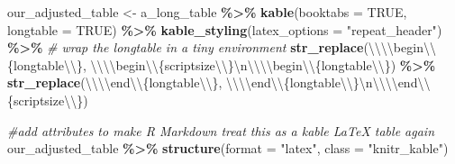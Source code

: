 \documentclass[a4paper, twoside]{templates/ociamthesis}
\newenvironment{Shaded}{\begin{snugshade}}{\end{snugshade}}
\newcommand{\CharTok}[1]{\textcolor[rgb]{0.31,0.60,0.02}{#1}}
\newcommand{\CommentTok}[1]{\textcolor[rgb]{0.56,0.35,0.01}{\textit{#1}}}
\newcommand{\DataTypeTok}[1]{\textcolor[rgb]{0.13,0.29,0.53}{#1}}
\newcommand{\KeywordTok}[1]{\textcolor[rgb]{0.13,0.29,0.53}{\textbf{#1}}}
\newcommand{\NormalTok}[1]{#1}
\newcommand{\OperatorTok}[1]{\textcolor[rgb]{0.81,0.36,0.00}{\textbf{#1}}}
\newcommand{\OtherTok}[1]{\textcolor[rgb]{0.56,0.35,0.01}{#1}}
\newcommand{\StringTok}[1]{\textcolor[rgb]{0.31,0.60,0.02}{#1}}
\renewenvironment{Shaded}
{
  \vspace{10pt}%
  \begin{snugshade}%
}{%
  \end{snugshade}%
  \vspace{8pt}%
}
\theoremstyle{definition}
\theoremstyle{definition}
\theoremstyle{definition}
\theoremstyle{definition}
\theoremstyle{remark}
\begin{document}
\begin{Shaded}
\begin{Highlighting}[]
\NormalTok{our\_adjusted\_table \textless{}{-}}\StringTok{ }\NormalTok{a\_long\_table }\OperatorTok{\%\textgreater{}\%}\StringTok{ }
\StringTok{  }\KeywordTok{kable}\NormalTok{(}\DataTypeTok{booktabs =} \OtherTok{TRUE}\NormalTok{, }\DataTypeTok{longtable =} \OtherTok{TRUE}\NormalTok{) }\OperatorTok{\%\textgreater{}\%}\StringTok{ }
\StringTok{  }\KeywordTok{kable\_styling}\NormalTok{(}\DataTypeTok{latex\_options =} \StringTok{"repeat\_header"}\NormalTok{) }\OperatorTok{\%\textgreater{}\%}\StringTok{ }
\StringTok{  }\CommentTok{\# wrap the longtable in a tiny environment}
\StringTok{  }\KeywordTok{str\_replace}\NormalTok{(}\StringTok{\textquotesingle{}}\CharTok{\textbackslash{}\textbackslash{}\textbackslash{}\textbackslash{}}\StringTok{begin}\CharTok{\textbackslash{}\textbackslash{}}\StringTok{\{longtable}\CharTok{\textbackslash{}\textbackslash{}}\StringTok{\}\textquotesingle{}}\NormalTok{, }
              \StringTok{\textquotesingle{}}\CharTok{\textbackslash{}\textbackslash{}\textbackslash{}\textbackslash{}}\StringTok{begin}\CharTok{\textbackslash{}\textbackslash{}}\StringTok{\{scriptsize}\CharTok{\textbackslash{}\textbackslash{}}\StringTok{\}}\CharTok{\textbackslash{}n\textbackslash{}\textbackslash{}\textbackslash{}\textbackslash{}}\StringTok{begin}\CharTok{\textbackslash{}\textbackslash{}}\StringTok{\{longtable}\CharTok{\textbackslash{}\textbackslash{}}\StringTok{\}\textquotesingle{}}\NormalTok{) }\OperatorTok{\%\textgreater{}\%}
\StringTok{  }\KeywordTok{str\_replace}\NormalTok{(}\StringTok{\textquotesingle{}}\CharTok{\textbackslash{}\textbackslash{}\textbackslash{}\textbackslash{}}\StringTok{end}\CharTok{\textbackslash{}\textbackslash{}}\StringTok{\{longtable}\CharTok{\textbackslash{}\textbackslash{}}\StringTok{\}\textquotesingle{}}\NormalTok{, }
              \StringTok{\textquotesingle{}}\CharTok{\textbackslash{}\textbackslash{}\textbackslash{}\textbackslash{}}\StringTok{end}\CharTok{\textbackslash{}\textbackslash{}}\StringTok{\{longtable}\CharTok{\textbackslash{}\textbackslash{}}\StringTok{\}}\CharTok{\textbackslash{}n\textbackslash{}\textbackslash{}\textbackslash{}\textbackslash{}}\StringTok{end}\CharTok{\textbackslash{}\textbackslash{}}\StringTok{\{scriptsize}\CharTok{\textbackslash{}\textbackslash{}}\StringTok{\}\textquotesingle{}}\NormalTok{)}

\CommentTok{\#add attributes to make R Markdown treat this as a kable LaTeX table again}
\NormalTok{our\_adjusted\_table }\OperatorTok{\%\textgreater{}\%}\StringTok{ }
\StringTok{  }\KeywordTok{structure}\NormalTok{(}\DataTypeTok{format =} \StringTok{"latex"}\NormalTok{, }\DataTypeTok{class =} \StringTok{"knitr\_kable"}\NormalTok{)}
\end{Highlighting}
\end{Shaded}
\end{document}
